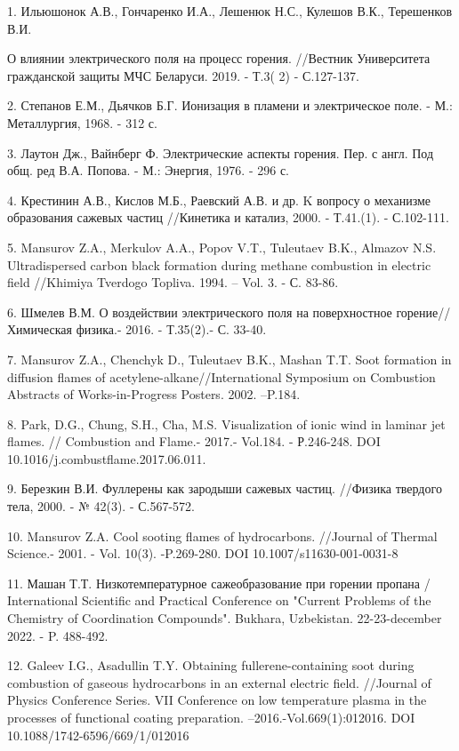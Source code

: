 \begin{noparindent}
1. Ильюшонок А.В., Гончаренко И.А., Лешенюк Н.С., Кулешов В.К.,
Терешенков В.И.

О влиянии электрического поля на процесс горения. //Вестник Университета
гражданской защиты МЧС Беларуси. 2019. - Т.3( 2) - С.127-137.

2. Степанов Е.М., Дьячков Б.Г. Ионизация в пламени и электрическое поле.
- М.: Металлургия, 1968. - 312 с.

3. Лаутон Дж., Вайнберг Ф. Электрические аспекты горения. Пер. с англ.
Под общ. ред В.А. Попова. - М.: Энергия, 1976. - 296 с.

4. Крестинин А.В., Кислов М.Б., Раевский А.В. и др. K вопросу о
механизме образования сажевых частиц //Кинетика и катализ, 2000. -
Т.41.(1). - С.102-111.

5. Mansurov Z.A., Merkulov A.A., Popov V.T., Tuleutaev B.K., Almazov
N.S. Ultradispersed carbon black formation during methane combustion in
electric field //Khimiya Tverdogo Topliva. 1994. -- Vol. 3. - С. 83-86.

6. Шмелев В.М. О воздействии электрического поля на поверхностное
горение//Химическая физика.- 2016. - Т.35(2).- С. 33-40.

7. Mansurov Z.A., Chenchyk D., Tuleutaev B.K., Mashan T.T. Soot
formation in diffusion flames of acetylene-alkane//International
Symposium on Combustion Abstracts of Works-in-Progress Posters. 2002.
--P.184.

8. Park, D.G., Chung, S.H., Cha, M.S. Visualization of ionic wind in
laminar jet flames. // Combustion and Flame.- 2017.- Vol.184. -
Р.246-248. DOI 10.1016/j.combustflame.2017.06.011.

9. Березкин В.И. Фуллерены как зародыши сажевых частиц. //Физика
твердого тела, 2000. - № 42(3). - С.567-572.

10. Mansurov Z.A. Cool sooting flames of hydrocarbons. //Journal of
Thermal Science.- 2001. - Vol. 10(3). -P.269-280. DOI
10.1007/s11630-001-0031-8

11. Машан Т.Т. Низкотемпературное сажеобразование при горении пропана /
International Scientific and Practical Conference on "Current Problems
of the Chemistry of Coordination Compounds". Bukhara, Uzbekistan.
22-23-december 2022. - P. 488-492.

12. Galeev I.G., Asadullin T.Y. Obtaining fullerene-containing soot
during combustion of gaseous hydrocarbons in an external electric field.
//Journal of Physics Conference Series. VII Conference on low
temperature plasma in the processes of functional coating preparation.
--2016.-Vol.669(1):012016. DOI 10.1088/1742-6596/669/1/012016
\end{noparindent}

